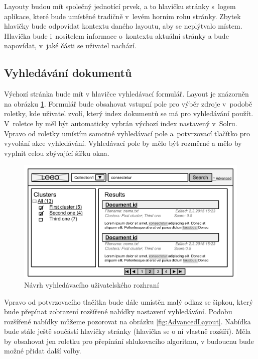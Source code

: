 Layouty budou mít společný jednotící prvek, a to hlavičku stránky s~logem aplikace, které bude umístěné tradičně v~levém horním rohu stránky. Zbytek hlavičky bude odpovídat kontextu daného layoutu, aby se neplýtvalo místem. Hlavička bude i~nositelem informace o~kontextu aktuální stránky a bude napovídat, v~jaké části se uživatel nachází.

\subsection{Vyhledávání dokumentů}
Výchozí stránka bude mít v hlavičce vyhledávací formulář. Layout je znázorněn na obrázku \ref{fig:SearchLayout}. Formulář bude obsahovat vstupní pole pro výběr zdroje v~podobě roletky, kde uživatel zvolí, který index dokumentů se má pro vyhledávání použít. V~roletce by měl být automaticky vybrán výchozí index nastavený v~Solru. Vpravo od roletky umístím samotné vyhledávací pole a~potvrzovací tlačítko pro vyvolání akce vyhledávání. Vyhledávací pole by mělo být rozměrné a mělo by vyplnit celou zbývající šířku okna.

\begin{figure}[h]
\begin{center}
\includegraphics[width=13cm]{SearchLayout}
\caption{Návrh vyhledávacího uživatelského rozhraní}
\label{fig:SearchLayout}
\end{center}
\end{figure}

Vpravo od potvrzovacího tlačítka bude dále umístěn malý odkaz se šipkou, který bude přepínat zobrazení rozšířené nabídky nastavení vyhledávání. Podobu rozšířené nabídky můžeme pozorovat na obrázku \ref{fig:AdvancedLayout}. Nabídka bude stále ještě součástí hlavičky stránky (hlavička se o ní vlastně rozšíří). Měla by obsahovat jen roletku pro přepínání shlukovacího algoritmu, v budoucnu bude možné přidat další volby.

